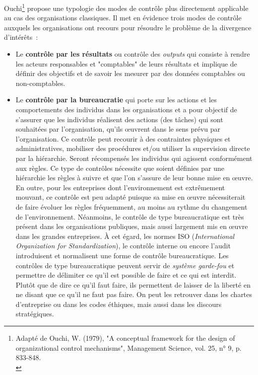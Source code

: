 \documentclass{kaobook}
\begin{document}
Ouchi\footnote{Adapté de Ouchi, W. (1979), "A conceptual framework for the design of organizational control mechanisms", Management Science, vol. 25, n° 9, p. 833-848.\\} propose une typologie des modes de contrôle plus directement applicable au cas des organisations classiques. Il met en évidence trois modes de contrôle auxquels les organisations ont recours pour résoudre le problème de la divergence d'intérêts :\\
\begin{itemize}
\item Le \textbf{contrôle par les résultats} ou contrôle des \emph{outputs} qui consiste à rendre les acteurs responsables et "comptables" de leurs résultats et implique de définir des objectifs et de savoir les mesurer par des données comptables ou non-comptables.\\
\item Le \textbf{contrôle par la bureaucratie} qui porte sur les actions et les comportements des individus dans les organisations et a pour objectif de s'assurer que les individus réalisent des actions (des tâches) qui sont souhaitées par l'organisation, qu'ils œuvrent dans le sens prévu par l'organisation. Ce contrôle peut recourir à des contraintes physiques et administratives, mobiliser des procédures et/ou utiliser la supervision directe par la hiérarchie. Seront récompensés les individus qui agissent conformément aux règles. Ce type de contrôles nécessite que soient définies par une hiérarchie les règles à suivre et que l'on s'assure de leur bonne mise en œuvre. En outre, pour les entreprises dont l'environnement est extrêmement mouvant, ce contrôle est peu adapté puisque sa mise en œuvre nécessiterait de faire évoluer les règles fréquemment, au moins au rythme du changement de l'environnement. Néanmoins, le contrôle de type bureaucratique est très présent dans les organisations publiques, mais aussi largement mis en œuvre dans les grandes entreprises. À cet égard, les normes ISO (\emph{International Organization for Standardization}), le contrôle interne ou encore l'audit introduisent et normalisent une forme de contrôle bureaucratique. Les contrôles de type bureaucratique peuvent servir de \emph{système garde-fou} et permettre de délimiter ce qu'il est possible de faire et ce qui est interdit. Plutôt que de dire ce qu'il faut faire, ils permettent de laisser de la liberté en ne disant que ce qu'il ne faut pas faire. On peut les retrouver dans les chartes d'entreprise ou dans les codes éthiques, mais aussi dans les discours stratégiques.\\

\end{itemize}
\end{document}
